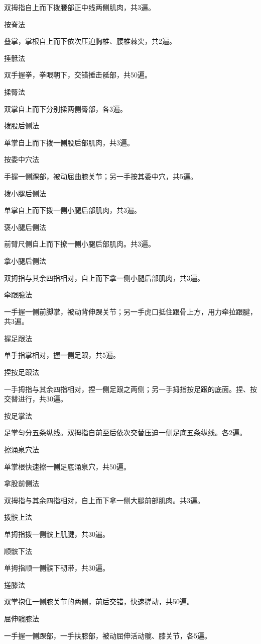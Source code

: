 \documentclass[12pt,UTF8,openany]{ctexbook}
\begin{document}
双拇指自上而下拨腰部正中线两侧肌肉，共3遍。

按脊法

叠掌，掌根自上而下依次压迫胸椎、腰椎棘突，共2遍。

捶骶法

双手握拳，拳眼朝下，交错捶击骶部，共50遍。

揉臀法

双掌自上而下分别揉两侧臀部，各3遍。

拨股后侧法

单掌自上而下拨一侧股后部肌肉，共3遍。

按委中穴法

手握一侧踝部，被动屈曲膝关节；另一手按其委中穴，共5遍。

拨小腿后侧法

单掌自上而下拨一侧小腿后部肌肉，共3遍。

褒小腿后侧法

前臂尺侧自上而下撩一侧小腿后部肌肉。共3遍。

拿小腿后侧法

双拇指与其余四指相对，自上而下拿一侧小腿后部肌肉，共3遍。

牵跟臆法

一手握一侧前脚掌，被动背伸踝关节；另一手虎口抵住跟骨上方，用力牵拉跟腱，共3遍。

握足跟法

单手指掌相对，握一侧足跟，共5遍。

捏按足跟法

一手拇指与其余四指相对，捏一侧足跟之两侧；另一手拇指按足跟的底面。捏、按交替进行，共30遍。

按足掌法

足掌匀分五条纵线。双拇指自前至后依次交替压迫一侧足底五条纵线。各2遍。

擦涌泉穴法

单掌根快速擦一侧足底涌泉穴，共50遍。

拿股前侧法

双拇指与其余四指相对，自上而下拿一侧大腿前部肌肉。共3遍。

拨髌上法

单拇指拨一侧髌上肌腱，共30遍。

顺髌下法

单拇指顺一侧髌下韧带，共30遍。

搓膝法

双掌抱住一侧膝关节的两侧，前后交错，快速搓动，共50遍。

屈伸髋膝法

一手握一侧踝部，一手扶膝部，被动屈伸活动髋、膝关节，各5遍。
\end{document}
